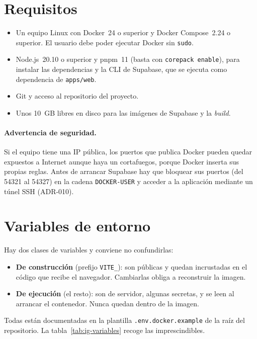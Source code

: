 \section{Requisitos}
\label{sec:ig-requisitos}

\begin{itemize}
  \item Un equipo Linux con Docker~24 o superior y Docker Compose~2.24 o
        superior. El usuario debe poder ejecutar Docker sin \texttt{sudo}.
  \item Node.js~20.10 o superior y pnpm~11 (basta con
        \texttt{corepack enable}), para instalar las dependencias y la CLI de
        Supabase, que se ejecuta como dependencia de \texttt{apps/web}.
  \item Git y acceso al repositorio del proyecto.
  \item Unos 10~GB libres en disco para las imágenes de Supabase y la
        \textit{build}.
\end{itemize}

\paragraph{Advertencia de seguridad.} Si el equipo tiene una IP pública, los
puertos que publica Docker pueden quedar expuestos a Internet aunque haya un
cortafuegos, porque Docker inserta sus propias reglas. Antes de arrancar
Supabase hay que bloquear sus puertos (del 54321 al 54327) en la cadena
\texttt{DOCKER-USER} y acceder a la aplicación mediante un túnel SSH
(ADR-010).

\section{Variables de entorno}
\label{sec:ig-variables}

Hay dos clases de variables y conviene no confundirlas:

\begin{itemize}
  \item \textbf{De construcción} (prefijo \texttt{VITE\_}): son públicas y
        quedan incrustadas en el código que recibe el navegador. Cambiarlas
        obliga a reconstruir la imagen.
  \item \textbf{De ejecución} (el resto): son de servidor, algunas secretas,
        y se leen al arrancar el contenedor. Nunca quedan dentro de la imagen.
\end{itemize}

Todas están documentadas en la plantilla \texttt{.env.docker.example} de la
raíz del repositorio. La tabla~\ref{tab:ig-variables} recoge las
imprescindibles.

